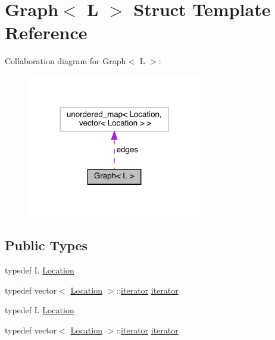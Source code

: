 \hypertarget{struct_graph}{}\section{Graph$<$ L $>$ Struct Template Reference}
\label{struct_graph}


Collaboration diagram for Graph$<$ L $>$\+:\nopagebreak
\begin{figure}[H]
\begin{center}
\leavevmode
\includegraphics[width=216pt]{struct_graph__coll__graph}
\end{center}
\end{figure}
\subsection*{Public Types}
\begin{DoxyCompactItemize}
\item 
typedef L \mbox{\hyperlink{struct_graph_aea7d42bb67163fe692353674435a1426}{Location}}
\item 
typedef vector$<$ \mbox{\hyperlink{struct_graph_aea7d42bb67163fe692353674435a1426}{Location}} $>$\+::\mbox{\hyperlink{struct_graph_af43d6412d7a6034eaeacde8ca1c1d984}{iterator}} \mbox{\hyperlink{struct_graph_af43d6412d7a6034eaeacde8ca1c1d984}{iterator}}
\item 
typedef L \mbox{\hyperlink{struct_graph_aea7d42bb67163fe692353674435a1426}{Location}}
\item 
typedef vector$<$ \mbox{\hyperlink{struct_graph_aea7d42bb67163fe692353674435a1426}{Location}} $>$\+::\mbox{\hyperlink{struct_graph_af43d6412d7a6034eaeacde8ca1c1d984}{iterator}} \mbox{\hyperlink{struct_graph_af43d6412d7a6034eaeacde8ca1c1d984}{iterator}}
\end{DoxyCompactItemize}
